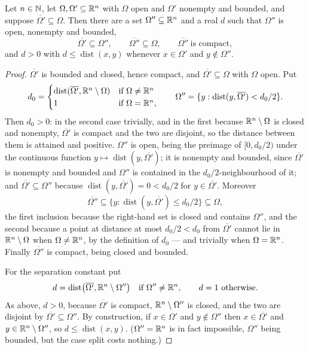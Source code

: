 \begin{lemma}
Let $n\in\mathbb{N}$, let $\Omega,\Omega'\subseteq\mathbb{R}^n$ with $\Omega$ open and $\Omega'$
nonempty and bounded, and suppose $\overline{\Omega'}\subseteq\Omega$.  Then
there are a set $\Omega''\subseteq\mathbb{R}^n$ and a real $d$ such that $\Omega''$ is
open, nonempty and bounded,
\[
\overline{\Omega'}\subseteq\Omega'',\qquad
\overline{\Omega''}\subseteq\Omega,\qquad
\overline{\Omega''}\ \text{is compact},
\]
and $d>0$ with $d\le\operatorname{dist}(x,y)$ whenever $x\in\Omega'$ and
$y\notin\Omega''$.
\end{lemma}
\begin{proof}
$\overline{\Omega'}$ is bounded and closed, hence compact, and
$\overline{\Omega'}\subseteq\Omega$ with $\Omega$ open.  Put
\[
d_0=\begin{cases}
\operatorname{dist}(\overline{\Omega'},\mathbb{R}^n\setminus\Omega) & \text{if }\Omega\ne\mathbb{R}^n\\
1 & \text{if }\Omega=\mathbb{R}^n,
\end{cases}
\qquad
\Omega''=\{y:\operatorname{dist}(y,\overline{\Omega'})<d_0/2\}.
\]
Then $d_0>0$: in the second case trivially, and in the first because
$\mathbb{R}^n\setminus\Omega$ is closed and nonempty, $\overline{\Omega'}$ is compact and
the two are disjoint, so the distance between them is attained and positive.
$\Omega''$ is open, being the preimage of $[0,d_0/2)$ under the continuous
function $y\mapsto\operatorname{dist}(y,\overline{\Omega'})$; it is nonempty and
bounded, since $\overline{\Omega'}$ is nonempty and bounded and $\Omega''$ is
contained in the $d_0/2$-neighbourhood of it; and
$\overline{\Omega'}\subseteq\Omega''$ because
$\operatorname{dist}(y,\overline{\Omega'})=0<d_0/2$ for $y\in\overline{\Omega'}$.
Moreover
\[
\overline{\Omega''}\subseteq\{y:\operatorname{dist}(y,\overline{\Omega'})\le d_0/2\}
\subseteq\Omega,
\]
the first inclusion because the right-hand set is closed and contains
$\Omega''$, and the second because a point at distance at most $d_0/2<d_0$ from
$\overline{\Omega'}$ cannot lie in $\mathbb{R}^n\setminus\Omega$ when $\Omega\ne\mathbb{R}^n$,
by the definition of $d_0$ --- and trivially when $\Omega=\mathbb{R}^n$.  Finally
$\overline{\Omega''}$ is compact, being closed and bounded.

For the separation constant put
\[
d=\operatorname{dist}\bigl(\overline{\Omega'},\mathbb{R}^n\setminus\Omega''\bigr)
\quad\text{if }\Omega''\ne\mathbb{R}^n,\qquad d=1\ \text{otherwise}.
\]
As above, $d>0$, because $\overline{\Omega'}$ is compact,
$\mathbb{R}^n\setminus\Omega''$ is closed, and the two are disjoint by
$\overline{\Omega'}\subseteq\Omega''$.  By construction, if $x\in\Omega'$ and
$y\notin\Omega''$ then $x\in\overline{\Omega'}$ and
$y\in\mathbb{R}^n\setminus\Omega''$, so $d\le\operatorname{dist}(x,y)$.
($\Omega''=\mathbb{R}^n$ is in fact impossible, $\Omega''$ being bounded, but the case
split costs nothing.)
\end{proof}
